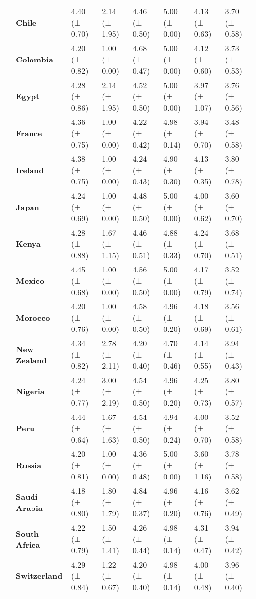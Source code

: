 \begin{longtable}{llllllll}
\textbf{} & \textbf{Chile} & 4.40 (± 0.70) & 2.14 (± 1.95) & 4.46 (± 0.50) & 5.00 (± 0.00) & 4.13 (± 0.63) & 3.70 (± 0.58) \\
\textbf{} & \textbf{Colombia} & 4.20 (± 0.82) & 1.00 (± 0.00) & 4.68 (± 0.47) & 5.00 (± 0.00) & 4.12 (± 0.60) & 3.73 (± 0.53) \\
\textbf{} & \textbf{Egypt} & 4.28 (± 0.86) & 2.14 (± 1.95) & 4.52 (± 0.50) & 5.00 (± 0.00) & 3.97 (± 1.07) & 3.76 (± 0.56) \\
\textbf{} & \textbf{France} & 4.36 (± 0.75) & 1.00 (± 0.00) & 4.22 (± 0.42) & 4.98 (± 0.14) & 3.94 (± 0.70) & 3.48 (± 0.58) \\
\textbf{} & \textbf{Ireland} & 4.38 (± 0.75) & 1.00 (± 0.00) & 4.24 (± 0.43) & 4.90 (± 0.30) & 4.13 (± 0.35) & 3.80 (± 0.78) \\
\textbf{} & \textbf{Japan} & 4.24 (± 0.69) & 1.00 (± 0.00) & 4.48 (± 0.50) & 5.00 (± 0.00) & 4.00 (± 0.62) & 3.60 (± 0.70) \\
\textbf{} & \textbf{Kenya} & 4.28 (± 0.88) & 1.67 (± 1.15) & 4.46 (± 0.51) & 4.88 (± 0.33) & 4.24 (± 0.70) & 3.68 (± 0.51) \\
\textbf{} & \textbf{Mexico} & 4.45 (± 0.68) & 1.00 (± 0.00) & 4.56 (± 0.50) & 5.00 (± 0.00) & 4.17 (± 0.79) & 3.52 (± 0.74) \\
\textbf{} & \textbf{Morocco} & 4.20 (± 0.76) & 1.00 (± 0.00) & 4.58 (± 0.50) & 4.96 (± 0.20) & 4.18 (± 0.69) & 3.56 (± 0.61) \\
\textbf{} & \textbf{New Zealand} & 4.34 (± 0.82) & 2.78 (± 2.11) & 4.20 (± 0.40) & 4.70 (± 0.46) & 4.14 (± 0.55) & 3.94 (± 0.43) \\
\textbf{} & \textbf{Nigeria} & 4.24 (± 0.77) & 3.00 (± 2.19) & 4.54 (± 0.50) & 4.96 (± 0.20) & 4.25 (± 0.73) & 3.80 (± 0.57) \\
\textbf{} & \textbf{Peru} & 4.44 (± 0.64) & 1.67 (± 1.63) & 4.54 (± 0.50) & 4.94 (± 0.24) & 4.00 (± 0.70) & 3.52 (± 0.58) \\
\textbf{} & \textbf{Russia} & 4.20 (± 0.81) & 1.00 (± 0.00) & 4.36 (± 0.48) & 5.00 (± 0.00) & 3.60 (± 1.16) & 3.78 (± 0.58) \\
\textbf{} & \textbf{Saudi Arabia} & 4.18 (± 0.80) & 1.80 (± 1.79) & 4.84 (± 0.37) & 4.96 (± 0.20) & 4.16 (± 0.76) & 3.62 (± 0.49) \\
\textbf{} & \textbf{South Africa} & 4.22 (± 0.79) & 1.50 (± 1.41) & 4.26 (± 0.44) & 4.98 (± 0.14) & 4.31 (± 0.47) & 3.94 (± 0.42) \\
\textbf{} & \textbf{Switzerland} & 4.29 (± 0.84) & 1.22 (± 0.67) & 4.20 (± 0.40) & 4.98 (± 0.14) & 4.00 (± 0.48) & 3.96 (± 0.40) \\

\end{longtable}
